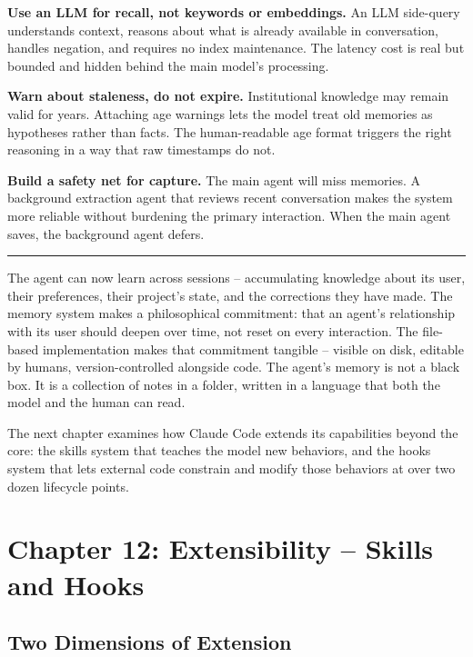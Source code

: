 \documentclass[
  english,
  11pt,
  letterpaper,
]{book}
\begin{document}
\textbf{Use an LLM for recall, not keywords or embeddings.} An LLM
side-query understands context, reasons about what is already available
in conversation, handles negation, and requires no index maintenance.
The latency cost is real but bounded and hidden behind the main model's
processing.

\textbf{Warn about staleness, do not expire.} Institutional knowledge
may remain valid for years. Attaching age warnings lets the model treat
old memories as hypotheses rather than facts. The human-readable age
format triggers the right reasoning in a way that raw timestamps do not.

\textbf{Build a safety net for capture.} The main agent will miss
memories. A background extraction agent that reviews recent conversation
makes the system more reliable without burdening the primary
interaction. When the main agent saves, the background agent defers.

\begin{center}\rule{0.5\linewidth}{0.5pt}\end{center}

The agent can now learn across sessions -- accumulating knowledge about
its user, their preferences, their project's state, and the corrections
they have made. The memory system makes a philosophical commitment: that
an agent's relationship with its user should deepen over time, not reset
on every interaction. The file-based implementation makes that
commitment tangible -- visible on disk, editable by humans,
version-controlled alongside code. The agent's memory is not a black
box. It is a collection of notes in a folder, written in a language that
both the model and the human can read.

The next chapter examines how Claude Code extends its capabilities
beyond the core: the skills system that teaches the model new behaviors,
and the hooks system that lets external code constrain and modify those
behaviors at over two dozen lifecycle points.

\chapter{Chapter 12: Extensibility -- Skills and
Hooks}\label{chapter-12-extensibility-skills-and-hooks}

\section{Two Dimensions of Extension}\label{two-dimensions-of-extension}
\end{document}
